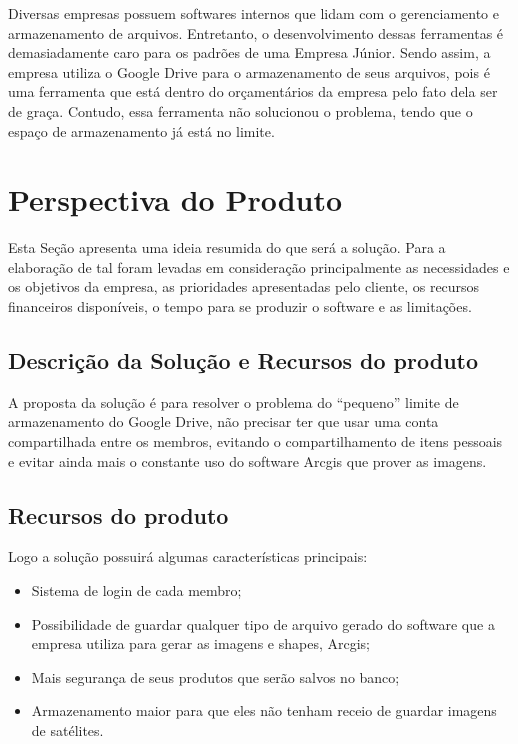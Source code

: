   Diversas empresas possuem softwares internos que lidam com o gerenciamento e armazenamento de arquivos. Entretanto, o desenvolvimento dessas
  ferramentas é demasiadamente caro para os padrões de uma Empresa Júnior. Sendo assim, a empresa utiliza o Google Drive para o armazenamento de
  seus arquivos, pois é uma ferramenta que está dentro do orçamentários da empresa pelo fato dela ser de graça. Contudo, essa ferramenta não
  solucionou o problema, tendo que o espaço de armazenamento já está no limite.

\section{Perspectiva do Produto}

  Esta Seção apresenta uma ideia resumida do que será a solução. Para a elaboração de tal foram levadas em consideração principalmente as
  necessidades e os objetivos da empresa, as prioridades apresentadas pelo cliente, os recursos financeiros disponíveis, o tempo para se
  produzir o software e as limitações.

\subsection{Descrição da Solução e Recursos do produto}

  A proposta da solução é para resolver o problema do “pequeno” limite de armazenamento do Google Drive, não precisar ter que usar uma conta
  compartilhada entre os membros, evitando o compartilhamento de itens pessoais e evitar ainda mais o constante uso do software Arcgis que
  prover as imagens.

\subsection{Recursos do produto}

  Logo a solução possuirá algumas características principais:

  \begin{itemize}
    \item Sistema de login de cada membro;
    \item Possibilidade de guardar qualquer tipo de arquivo gerado do software que a empresa utiliza para gerar as imagens e shapes, Arcgis;
    \item Mais segurança de seus produtos que serão salvos no banco;
    \item Armazenamento maior para que eles não tenham receio de guardar imagens de satélites.
  \end{itemize}


